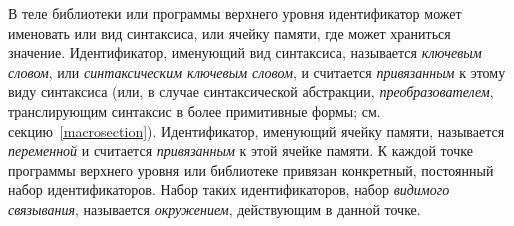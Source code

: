 В теле библиотеки или программы верхнего уровня идентификатор может именовать
или вид синтаксиса, или ячейку памяти, где может храниться
значение. Идентификатор, именующий вид синтаксиса, называется {\em ключевым
  словом}, или {\em синтаксическим ключевым словом}, и считается {\em привязанным} к этому виду синтаксиса (или, в случае
синтаксической абстракции, {\em преобразователем}, транслирующим синтаксис в более
примитивные формы; см. секцию~\ref{macrosection}). Идентификатор, именующий ячейку памяти,
называется {\em переменной} и считается {\em привязанным} к этой
ячейке памяти. К каждой точке программы верхнего уровня или библиотеке привязан конкретный,
постоянный набор идентификаторов. Набор таких идентификаторов, набор
\textit{видимого связывания}, называется {\em окружением}, действующим в
данной точке.

